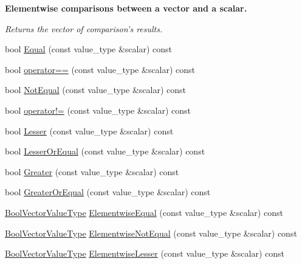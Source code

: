 \begin{Indent}{\bf Elementwise comparisons between a vector and a scalar.}\par
{\em Returns the vector of comparison's results. }\begin{DoxyCompactItemize}
\item 
bool \hyperlink{classvct_fixed_size_const_vector_base_a3f17febef880688b00147208cdd1eb15}{Equal} (const value\-\_\-type \&scalar) const 
\item 
bool \hyperlink{classvct_fixed_size_const_vector_base_a3dc305977c625937fd0809ae2b171d8c}{operator==} (const value\-\_\-type \&scalar) const 
\item 
bool \hyperlink{classvct_fixed_size_const_vector_base_ab33e5ab35918ea803a5c94f3f9ee7a9e}{Not\-Equal} (const value\-\_\-type \&scalar) const 
\item 
bool \hyperlink{classvct_fixed_size_const_vector_base_a22f3b10fd91364fa701b9a775436fb89}{operator!=} (const value\-\_\-type \&scalar) const 
\item 
bool \hyperlink{classvct_fixed_size_const_vector_base_ac047078e830c5fbe4fcfa01b6930026d}{Lesser} (const value\-\_\-type \&scalar) const 
\item 
bool \hyperlink{classvct_fixed_size_const_vector_base_a992df32d08f73a6c97f0ff49796fd940}{Lesser\-Or\-Equal} (const value\-\_\-type \&scalar) const 
\item 
bool \hyperlink{classvct_fixed_size_const_vector_base_aa08707e079adf289afb2a381baee6878}{Greater} (const value\-\_\-type \&scalar) const 
\item 
bool \hyperlink{classvct_fixed_size_const_vector_base_a59ac073f92ab479bb1292ff336b9dcdb}{Greater\-Or\-Equal} (const value\-\_\-type \&scalar) const 
\item 
\hyperlink{classvct_fixed_size_const_vector_base_a15899465a75a2f78965bdcf2d6e34bc5}{Bool\-Vector\-Value\-Type} \hyperlink{classvct_fixed_size_const_vector_base_a0e410fd6fc061481880f6052f6af3aa0}{Elementwise\-Equal} (const value\-\_\-type \&scalar) const 
\item 
\hyperlink{classvct_fixed_size_const_vector_base_a15899465a75a2f78965bdcf2d6e34bc5}{Bool\-Vector\-Value\-Type} \hyperlink{classvct_fixed_size_const_vector_base_ab00e79ffdc3b73f4c13732d2b195a8e3}{Elementwise\-Not\-Equal} (const value\-\_\-type \&scalar) const 
\item 
\hyperlink{classvct_fixed_size_const_vector_base_a15899465a75a2f78965bdcf2d6e34bc5}{Bool\-Vector\-Value\-Type} \hyperlink{classvct_fixed_size_const_vector_base_a822a3c606a54eff1d9817c61b096e51f}{Elementwise\-Lesser} (const value\-\_\-type \&scalar) const 

\end{DoxyCompactItemize}
\end{Indent}
